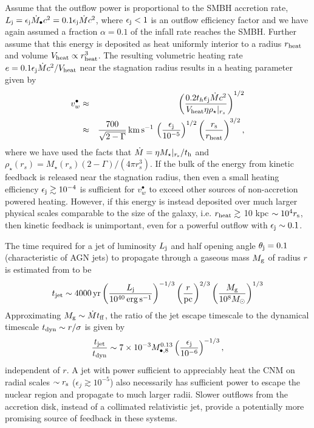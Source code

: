 \documentclass[usenatbib,fleqn]{mn2e}
\newcommand{\rs}{r_s}
\renewcommand{\th}{t_h}
\begin{document}
Assume that the outflow power is proportional to the SMBH accretion
rate, $L_{\rm j} = \epsilon_{\rm j} \dot{M}_{\bullet}c^{2} =
0.1\epsilon_{\rm j} \dot{M}c^{2} $, where $\epsilon_{\rm j} < 1$ is an
outflow efficiency factor and we have again assumed a fraction $\alpha
= 0.1$ of the infall rate reaches the SMBH.  Further assume that this
energy is deposited as heat uniformly interior to a radius $r_{\rm
  heat}$ and volume $V_{\rm heat} \propto r_{\rm heat}^{3}$.  The
resulting volumetric heating rate $e = 0.1\epsilon_{\rm
  j}\dot{M}c^{2}/V_{\rm heat}$ near the stagnation radius results in a
heating parameter given by
\begin{eqnarray} 
  v_{w}^{\bullet} &\approx& \left(\frac{0.2 \th \epsilon_{\rm j}\dot{M}c^{2}}{V_{\rm heat}\eta
      \rho_{\star}|_{r_{s}}}\right)^{1/2} \\
  &\approx& \frac{700}{\sqrt{2-\Gamma}}\,{\rm km\,s^{-1}}\,\left(\frac{\epsilon_{\rm
        j}}{10^{-5}}\right)^{1/2}\left(\frac{r_{\rm s}}{r_{\rm
        heat}}\right)^{3/2} ,
\label{eq:vjet}
\end{eqnarray} 
where we have used the facts that $\dot{M} = \eta M_{\star}|_{r_{\rm
    s}}/t_{\rm h}$ and $\rho_{\star}(\rs) = M_{\star}(\rs)
(2-\Gamma)/(4 \pi \rs^3)$.  If the bulk of the energy from kinetic
feedback is released near the stagnation radius, then even a small
heating efficiency $\epsilon_{\rm j} \gtrsim 10^{-4}$ is sufficient
for $v_{w}^{\bullet}$ to exceed other sources of non-accretion powered
heating.  However, if this energy is instead deposited over much
larger physical scales comparable to the size of the galaxy,
i.e. $r_{\rm heat} \gtrsim $ 10 kpc $\sim 10^{4}r_{\rm s}$, then
kinetic feedback is unimportant, even for a powerful outflow with
$\epsilon_{\rm j} \sim 0.1$.

The time required for a jet of luminosity $L_{\rm j}$ and half opening
angle $\theta_{\rm j} = 0.1$ (characteristic of AGN jets) to propagate
through a gaseous mass $M_{\rm g}$ of radius $r$ is estimated from
\citet{Bromberg+11} to be
\begin{eqnarray}
  t_{\rm jet} \sim 4000\,{\rm yr}\left(\frac{{L}_{\rm j}}{10^{40}\,\rm erg\,s^{-1}}\right)^{-1/3}\left(\frac{r}{\rm pc}\right)^{2/3}\left(\frac{M_{\rm g}}{10^{8}M_{\odot}}\right)^{1/3} 
\end{eqnarray}
Approximating $M_{\rm g} \sim \dot{M}t_{\rm ff}$, the ratio of the jet
escape timescale to the dynamical timescale $t_{\rm dyn} \sim
r/\sigma$ is given by
\begin{equation}
  \frac{t_{\rm jet}}{t_{\rm dyn}} \sim 7\times 10^{-3}M_{\bullet,8}^{0.13}\left(\frac{\epsilon_{\rm j}}{10^{-6}}\right)^{-1/3},
\end{equation}
independent of $r$.  A jet with power sufficient to appreciably heat
the CNM on radial scales $\sim r_{\rm s}$ ($\epsilon_{j} \gtrsim
10^{-5}$) also necessarily has sufficient power to escape the nuclear
region and propagate to much larger radii.  Slower outflows from the
accretion disk, instead of a collimated relativistic jet, provide
a potentially more promising source of feedback in these systems.
\end{document}
